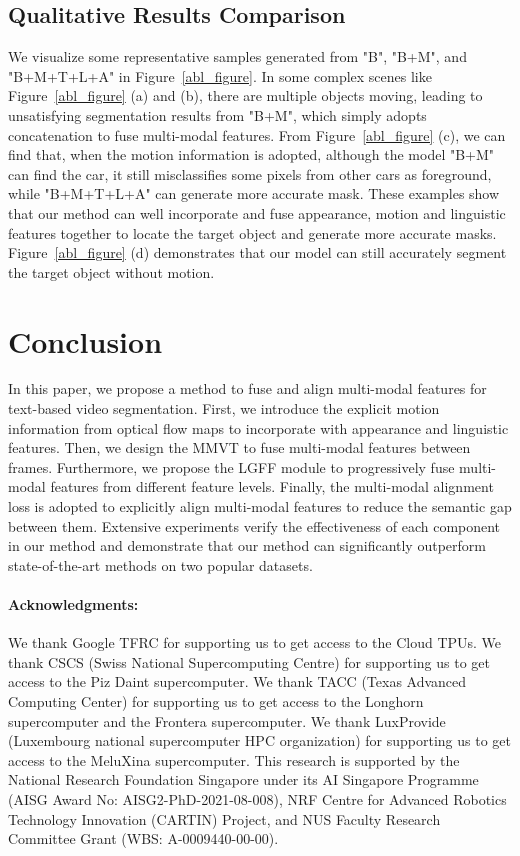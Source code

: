 \documentclass[10pt,twocolumn,letterpaper]{article}
\begin{document}
\subsection{Qualitative Results Comparison}
\vspace{-2mm} 
We visualize some representative samples generated from "B", "B+M", and "B+M+T+L+A" in Figure~\ref{abl_figure}. In some complex scenes like Figure~\ref{abl_figure} (a) and (b), there are multiple objects moving, leading to unsatisfying segmentation results from "B+M", which simply adopts concatenation to fuse multi-modal features. From Figure~\ref{abl_figure} (c), we can find that, when the motion information is adopted, although the model "B+M" can find the car, it still misclassifies some pixels from other cars as foreground, while "B+M+T+L+A" can generate more accurate mask. These examples show that our method can well incorporate and fuse appearance, motion and linguistic features together to locate the target object and generate more accurate masks. Figure~\ref{abl_figure} (d) demonstrates that our model can still accurately segment the target object without motion.


\vspace{-2mm}  
\section{Conclusion}
\vspace{-2mm}
In this paper, we propose a method to fuse and align multi-modal features for text-based video segmentation. First, we introduce the explicit motion information from optical flow maps to incorporate with appearance and linguistic features. Then, we design the MMVT to fuse multi-modal features between frames. Furthermore, we propose the LGFF module to progressively fuse multi-modal features from different feature levels. Finally, the multi-modal alignment loss is adopted to explicitly align multi-modal features to reduce the semantic gap between them.  Extensive experiments verify the effectiveness of each component in our method and demonstrate that our method can significantly outperform state-of-the-art methods on two popular datasets. 

\vspace{-6mm}  
\paragraph{Acknowledgments:}
We thank Google TFRC for supporting us to get access to the Cloud TPUs. We thank CSCS (Swiss National Supercomputing Centre) for supporting us to get access to the Piz Daint supercomputer. We thank TACC (Texas Advanced Computing Center) for supporting us to get access to the Longhorn supercomputer and the Frontera supercomputer. We thank LuxProvide (Luxembourg national supercomputer HPC organization) for supporting us to get access to the MeluXina supercomputer. This research is supported by the National Research Foundation Singapore under its AI Singapore Programme (AISG Award No: AISG2-PhD-2021-08-008),
NRF Centre for Advanced Robotics Technology Innovation (CARTIN) Project,
and NUS Faculty Research Committee Grant (WBS: A-0009440-00-00).






{\small


}
\end{document}
